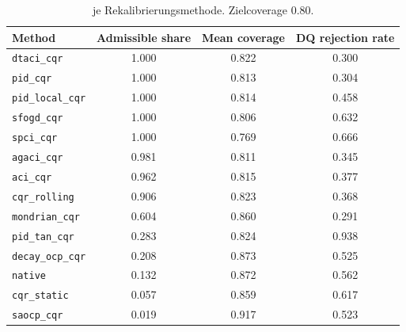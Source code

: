 \begin{table}[t]
\centering
\caption{%
         je Rekalibrierungsmethode. Zielcoverage 0.80.}
\label{tab:res_gate}
\begin{tabular}{lccc}
\toprule
Method & Admissible share & Mean coverage & DQ rejection rate \\
\midrule
\texttt{dtaci\_cqr}      & 1.000 & 0.822 & 0.300 \\
\texttt{pid\_cqr}        & 1.000 & 0.813 & 0.304 \\
\texttt{pid\_local\_cqr} & 1.000 & 0.814 & 0.458 \\
\texttt{sfogd\_cqr}      & 1.000 & 0.806 & 0.632 \\
\texttt{spci\_cqr}       & 1.000 & 0.769 & 0.666 \\
\texttt{agaci\_cqr}      & 0.981 & 0.811 & 0.345 \\
\texttt{aci\_cqr}        & 0.962 & 0.815 & 0.377 \\
\texttt{cqr\_rolling}    & 0.906 & 0.823 & 0.368 \\
\texttt{mondrian\_cqr}   & 0.604 & 0.860 & 0.291 \\
\texttt{pid\_tan\_cqr}   & 0.283 & 0.824 & 0.938 \\
\texttt{decay\_ocp\_cqr} & 0.208 & 0.873 & 0.525 \\
\texttt{native}          & 0.132 & 0.872 & 0.562 \\
\texttt{cqr\_static}     & 0.057 & 0.859 & 0.617 \\
\texttt{saocp\_cqr}      & 0.019 & 0.917 & 0.523 \\
\bottomrule
\end{tabular}
\end{table}


